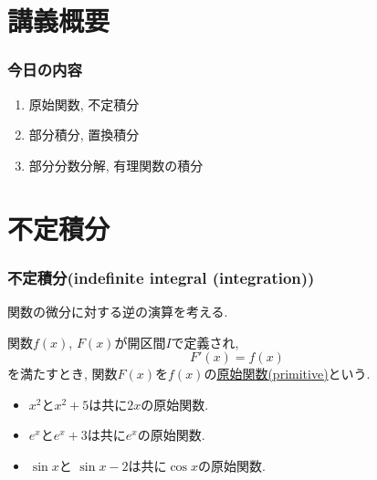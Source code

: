 
\section{講義概要}


\begin{frame}
\frametitle{今日の内容}



\begin{enumerate}
\item 原始関数, 不定積分
\item 部分積分, 置換積分
\item 部分分数分解, 有理関数の積分
\end{enumerate} 



\end{frame}








\section{不定積分}


\begin{frame}
\frametitle{不定積分(indefinite integral (integration))}

関数の微分に対する逆の演算を考える. 

\begin{Def}
関数$f(x)$, $F(x)$が開区間$I$で定義され, 
$$
F'(x) = f(x)
$$
を満たすとき, 関数$F(x)$を$f(x)$の\underline{原始関数(primitive)}という. 
\end{Def}


\begin{itemize}
\item $x^2$と$x^2+5$は共に$2x$の原始関数. 
\item $e^x$と$e^x+3$は共に$e^x$の原始関数. 
\item $\sin x$と $\sin x-2$は共に$\cos x$の原始関数. 
\end{itemize}

\end{frame}

